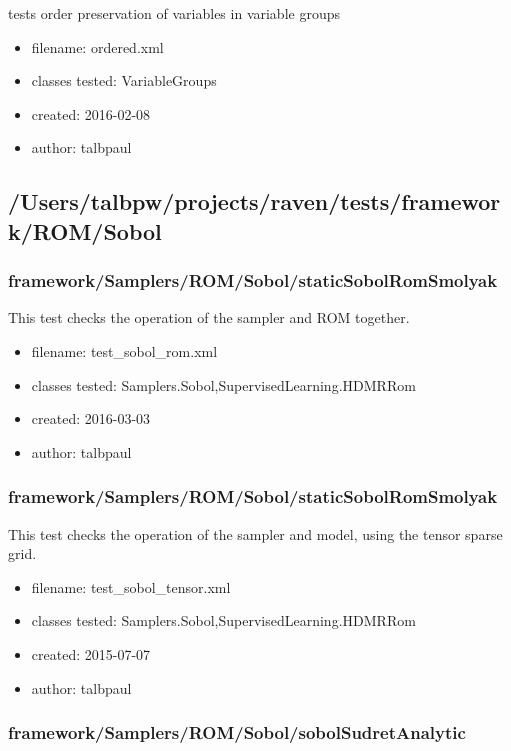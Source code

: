       tests order preservation of variables in variable groups
    
      \begin{itemize}
          \item filename: ordered.xml
          \item classes tested: VariableGroups
          \item created: 2016-02-08
          \item author: talbpaul
      \end{itemize}
  \subsection{/Users/talbpw/projects/raven/tests/framework/ROM/Sobol}
    \subsubsection{framework/Samplers/ROM/Sobol/staticSobolRomSmolyak}
      
      This test checks the operation of the sampler and ROM together.
    
      \begin{itemize}
          \item filename: test\_sobol\_rom.xml
          \item classes tested: Samplers.Sobol,SupervisedLearning.HDMRRom
          \item created: 2016-03-03
          \item author: talbpaul
      \end{itemize}
    \subsubsection{framework/Samplers/ROM/Sobol/staticSobolRomSmolyak}
      
      This test checks the operation of the sampler and model, using the tensor sparse grid.
    
      \begin{itemize}
          \item filename: test\_sobol\_tensor.xml
          \item classes tested: Samplers.Sobol,SupervisedLearning.HDMRRom
          \item created: 2015-07-07
          \item author: talbpaul
      \end{itemize}
    \subsubsection{framework/Samplers/ROM/Sobol/sobolSudretAnalytic}
      
